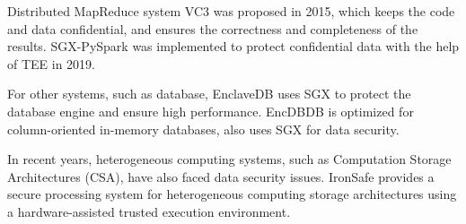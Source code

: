 Distributed MapReduce system VC3 \cite{Schuster2015VC3TD} was proposed in 2015,
which keeps the code and data confidential, and ensures the correctness and completeness of
the results. SGX-PySpark \cite{Quoc2019SGXPySparkSD} was implemented to protect confidential data
with the help of TEE in 2019.

For other systems, such as database, EnclaveDB \cite{Priebe2018EnclaveDBAS} uses SGX to
protect the database engine and ensure high performance.
EncDBDB \cite{Fuhry2021EncDBDBSE} is optimized for column-oriented in-memory databases,
also uses SGX for data security.

In recent years, heterogeneous computing systems, such as Computation Storage Architectures (CSA),
have also faced data security issues.
IronSafe \cite{Unnibhavi2022SecureAP} provides a secure processing system for heterogeneous
computing storage architectures using a hardware-assisted trusted execution environment.